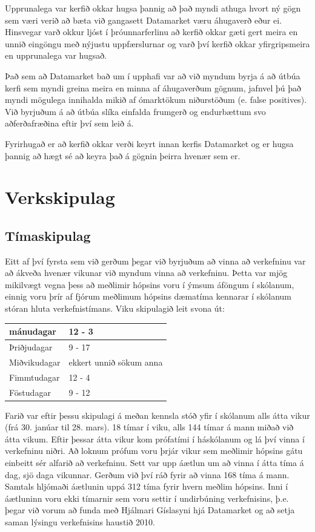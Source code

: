 \documentclass{article}
\begin{document}
Upprunalega var kerfið okkar hugsa þannig að það myndi athuga hvort ný gögn sem
væri verið að bæta við gangasett Datamarket væru áhugaverð eður ei. Hinsvegar
varð okkur ljóst í þróunnarferlinu að kerfið okkar gæti gert meira en unnið
eingöngu með nýjustu uppfærslurnar og varð því kerfið okkar yfirgripsmeira en
upprunalega var hugsað.

Það sem að Datamarket bað um í upphafi var að við myndum byrja á að útbúa kerfi sem myndi greina meira en minna af áhugaverðum gögnum, jafnvel þú það myndi mögulega innihalda mikið af ómarktökum niðurstöðum (e. false positives). Við byrjuðum á að útbúa slíka einfalda frumgerð og endurbættum svo aðferðafræðina eftir því sem leið á.

Fyrirhugað er að kerfið okkar verði keyrt innan kerfis Datamarket og er hugsa þannig að hægt sé að keyra það á gögnin þeirra hvenær sem er.

\newpage

\section{Verkskipulag}

\subsection{Tímaskipulag}

Eitt af því fyrsta sem við gerðum þegar við byrjuðum að vinna að verkefninu var að ákveða hvenær vikunar við myndum vinna að verkefninu. Þetta var mjög mikilvægt vegna þess að meðlimir hópsins voru í ýmsum áföngum í skólanum, einnig voru þrír af fjórum meðlimum hópsins dæmatíma kennarar í skólanum stóran hluta verkefnistímans. 
Viku skipulagið leit svona út:

\vspace{5 mm}
\begin{tabular}{| l | l |}
\hline
  mánudagar & 12 - 3 \\
  \hline
  Þriðjudagar & 9 - 17 \\
  \hline
  Miðvikudagar & ekkert unnið sökum anna \\
  \hline
  Fimmtudagar & 12 - 4 \\
  \hline
  Föstudagar & 9 - 12\\
\hline
\end{tabular}
\vspace{5 mm}

Farið var eftir þessu skipulagi á meðan kennsla stóð yfir í skólanum alls átta vikur (frá 30. janúar til 28. mars). 18 tímar í viku, alls 144 tímar á mann miðað við átta vikum.
Eftir þessar átta vikur kom prófatími í háskólanum og lá því vinna í verkefninu niðri. 
Að loknum prófum voru þrjár vikur sem meðlimir hópsins gátu einbeitt sér alfarið að verkefninu. Sett var upp áætlun um að vinna í átta tíma á dag, sjö daga vikunnar. Gerðum við því ráð fyrir að vinna 168 tíma á mann. 
Samtals hljómaði áætlunin uppá 312 tíma fyrir hvern meðlim hópsins. Inni í áætluninn voru ekki tímarnir sem voru settir í undirbúning verkefnisins, þ.e. þegar við vorum að funda með Hjálmari Gíslasyni hjá Datamarket og að setja saman lýsingu verkefnisins haustið 2010.
\end{document}
